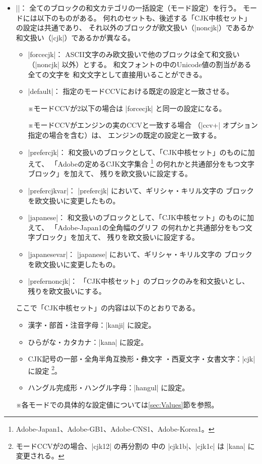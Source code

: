 \documentclass[uplatex,dvipdfmx,a4paper]{jsarticle}
\newcommand{\Meta}[1]{$\langle$\mbox{}#1\mbox{}$\rangle$}
\newcommand{\Note}{\par\noindent ※}
\newcommand{\Means}{：\quad}
\begin{document}
\begin{itemize}
\item |\cjkcategorymode{|\Meta{モード}|}|\Means
  全てのブロックの和文カテゴリの一括設定（モード設定）を行う。
  モードには以下のものがある。
  何れのセットも、後述する「CJK中核セット」の設定は共通であり、
  それ以外のブロックが欧文扱い（|noncjk|）であるか
  和文扱い（|cjk|）であるかが異なる。
  \begin{itemize}
  \item |forcecjk|\Means
    ASCII文字のみ欧文扱いで他のブロックは全て和文扱い
    （|noncjk| 以外）とする。
    和文フォントの中のUnicode値の割当がある全ての文字を
    和文文字として直接用いることができる。
  \item |default|\Means
    指定のモードCCVにおける既定の設定と一致させる。
    \Note モードCCVが2以下の場合は |forcecjk| と同一の設定になる。
    \Note モードCCVがエンジンの実のCCVと一致する場合
      （|ccv+| オプション指定の場合を含む）は、
      エンジンの既定の設定と一致する。
  \item |prefercjk|\Means
    和文扱いのブロックとして、「CJK中核セット」のものに加えて、
    「Adobeの定めるCJK文字集合
    \footnote{Adobe-Japan1、Adobe-GB1、Adobe-CNS1、Adobe-Korea1。}%
    の何れかと共通部分をもつ文字ブロック」を加えて、
    残りを欧文扱いに設定する。
  \item |prefercjkvar|\Means
    |prefercjk| において、ギリシャ・キリル文字の
    ブロックを欧文扱いに変更したもの。
  \item |japanese|\Means
    和文扱いのブロックとして、「CJK中核セット」のものに加えて、
    「Adobe-Japan1の全角幅のグリフ
    の何れかと共通部分をもつ文字ブロック」を加えて、
    残りを欧文扱いに設定する。
  \item |japanesevar|\Means
    |japanese| において、ギリシャ・キリル文字の
    ブロックを欧文扱いに変更したもの。
  \item |prefernoncjk|\Means
    「CJK中核セット」のブロックのみを和文扱いとし、
    残りを欧文扱いにする。
  \end{itemize}

  ここで「CJK中核セット」の内容は以下のとおりである。
    \begin{itemize}
    \item 漢字・部首・注音字母\Means |kanji| に設定。
    \item ひらがな・カタカナ\Means |kana| に設定。
    \item CJK記号の一部・全角半角互換形・彝文字
      ・西夏文字・女書文字\Means |cjk| に設定
      \footnote{モードCCVが2の場合、|cjk12| の再分割の
        中の |cjk1b|、|cjk1c| は |kana| に変更される。}。
    \item ハングル完成形・ハングル字母\Means |hangul| に設定。
  \end{itemize}
  \Note 各モードでの具体的な設定値については\ref{sec:Values}節を参照。

\end{itemize}
\end{document}
